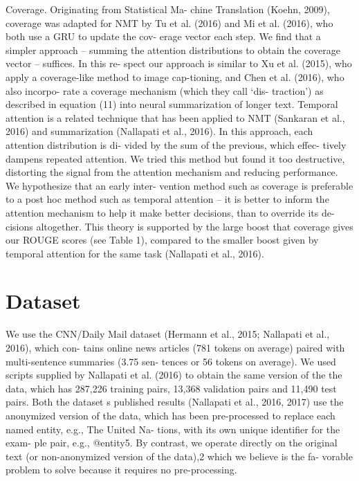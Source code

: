 \documentclass[UTF8]{ctexart}
\begin{document}
Coverage. Originating from Statistical Ma-
chine Translation (Koehn, 2009), coverage was
adapted for NMT by Tu et al. (2016) and Mi et al.
(2016), who both use a GRU to update the cov-
erage vector each step. We find that a simpler
approach – summing the attention distributions to
obtain the coverage vector – suffices. In this re-
spect our approach is similar to Xu et al. (2015),
who apply a coverage-like method to image cap-tioning, and Chen et al. (2016), who also incorpo-
rate a coverage mechanism (which they call ‘dis-
traction’) as described in equation (11) into neural
summarization of longer text.
Temporal attention is a related technique that
has been applied to NMT (Sankaran et al., 2016)
and summarization (Nallapati et al., 2016). In
this approach, each attention distribution is di-
vided by the sum of the previous, which effec-
tively dampens repeated attention. We tried this
method but found it too destructive, distorting the
signal from the attention mechanism and reducing
performance. We hypothesize that an early inter-
vention method such as coverage is preferable to
a post hoc method such as temporal attention – it
is better to inform the attention mechanism to help
it make better decisions, than to override its de-
cisions altogether. This theory is supported by the
large boost that coverage gives our ROUGE scores
(see Table 1), compared to the smaller boost given
by temporal attention for the same task (Nallapati
et al., 2016).




   \section{Dataset}

   We use the CNN/Daily Mail dataset (Hermann
et al., 2015; Nallapati et al., 2016), which con-
tains online news articles (781 tokens on average)
paired with multi-sentence summaries (3.75 sen-
tences or 56 tokens on average). We used scripts
supplied by Nallapati et al. (2016) to obtain the
same version of the the data, which has 287,226
training pairs, 13,368 validation pairs and 11,490
test pairs. Both the dataset  s published results
(Nallapati et al., 2016, 2017) use the anonymized
version of the data, which has been pre-processed
to replace each named entity, e.g., The United Na-
tions, with its own unique identifier for the exam-
ple pair, e.g., @entity5. By contrast, we operate
directly on the original text (or non-anonymized
version of the data),2 which we believe is the fa-
vorable problem to solve because it requires no
pre-processing.
\end{document}
